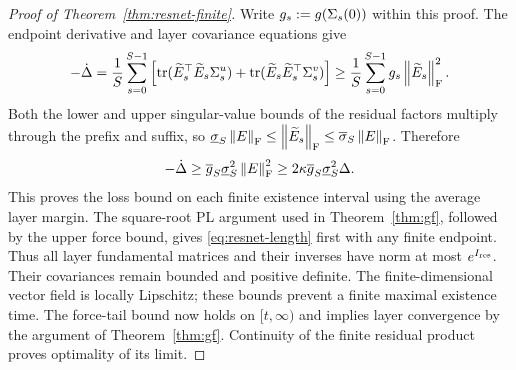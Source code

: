 \begin{proof}[Proof of Theorem~\ref{thm:resnet-finite}]
Write $g_s:=g(\Sigma_s(0))$ within this proof.
The endpoint derivative and layer covariance equations give
\[
 -\dot\Delta
 =\frac1S\sum_{s=0}^{S-1}
 \left[\operatorname{tr}(\widetilde E_s^\top \widetilde E_s\Sigma^u_s)+\operatorname{tr}(\widetilde E_s\widetilde E_s^\top\Sigma^v_s)\right]
 \ge\frac1S\sum_{s=0}^{S-1}g_s\left\lVert \widetilde E_s \right\rVert_{\mathrm{F}}^2.
\]
Both the lower and upper singular-value bounds of the residual factors
multiply through the prefix and suffix, so
$\underline{\sigma}_S\left\lVert E \right\rVert_{\mathrm{F}}\le\left\lVert \widetilde E_s \right\rVert_{\mathrm{F}}\le \overline{\sigma}_S\left\lVert E \right\rVert_{\mathrm{F}}$.
Therefore
\[
 -\dot\Delta\ge\overline g_S\underline{\sigma}_S^2\left\lVert E \right\rVert_{\mathrm{F}}^2
 \ge2\kappa\overline g_S\underline{\sigma}_S^2\Delta.
\]
This proves the loss bound on each finite existence interval using the
average layer margin. The square-root PL
argument used in Theorem~\ref{thm:gf}, followed by the upper force bound,
gives \eqref{eq:resnet-length} first with any finite endpoint.
Thus all layer fundamental matrices and their inverses have norm at most
$e^{I_{\rm res}}$. Their covariances remain bounded and positive definite.
The finite-dimensional vector field is locally Lipschitz; these bounds
prevent a finite maximal existence time. The force-tail bound now holds
on $[t,\infty)$ and implies layer convergence by the argument of
Theorem~\ref{thm:gf}. Continuity of the finite residual product proves
optimality of its limit.
\end{proof}

